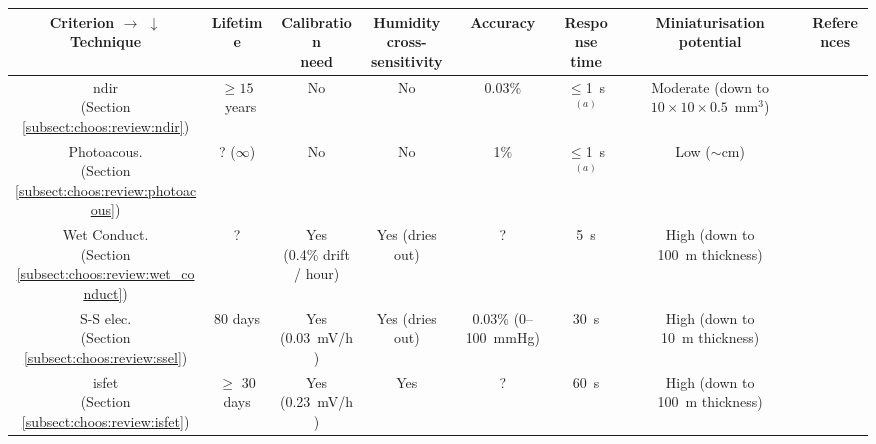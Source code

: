 \def\arraystretch{1.25}
\begin{table}
	\centering
	\begin{tabularx}{\textwidth}{c|c|c|c|c|c|c|c}
		\specialcell{Criterion $\rightarrow$\\$\downarrow$ Technique} & Lifetime & \specialcell{Calibration\\need} & \specialcell{Humidity cross-\\sensitivity} & Accuracy & \specialcell{Response\\time} & \specialcell{Miniaturisation\\potential} & References \\ \hline \hline
		
		\specialcell{\gls{ndir}\\(Section \ref{subsect:choos:review:ndir})} & $\geq15$~years & No & No & 0.03\% & $\leq$1~s $^{(a)}$ & \specialcell{Moderate (down to\\$10\times 10\times 0.5$~mm$^3$)} & \cite{zhang2010, gibson2013, jing2020, popa2019}\\ \hline
		
		\specialcell{Photoacous.\\(Section \ref{subsect:choos:review:photoacous})} & ? ($\infty$) & No & No & 1\% & $\leq$1~s $^{(a)}$ & Low ($\sim$cm) & \cite{kosterev2006, scholz2017, eberl2019} \\ \hline
		
		\specialcell{Wet Conduct.\\(Section \ref{subsect:choos:review:wet_conduct})}& ? & \specialcell{Yes\\ (0.4\% drift / hour)} & Yes (dries out) & ? & 5~s & \specialcell{High (down to\\100~\textmu{}m thickness)} & \cite{varlan1997, mirtaheri2004b} \\ \hline
		
		\specialcell{S-S elec.\\(Section \ref{subsect:choos:review:ssel})} & 80 days & Yes (0.03~mV/h) & Yes (dries out) & 0.03\% (0--100~mmHg) & 30~s & \specialcell{High (down to\\10~\textmu{}m thickness)} & \cite{severinghaus1958, hahn1980, shin2000, beyenal2004} \\ \hline
		
		\specialcell{\gls{isfet}\\(Section \ref{subsect:choos:review:isfet})} & $\geq$ 30 days & Yes (0.23~mV/h) & Yes & ? & 60~s & \specialcell{High (down to\\100~\textmu{}m thickness)} & \cite{hu1989, hsieh2014} \\ \hline
		

\end{tabularx}
\end{table}
